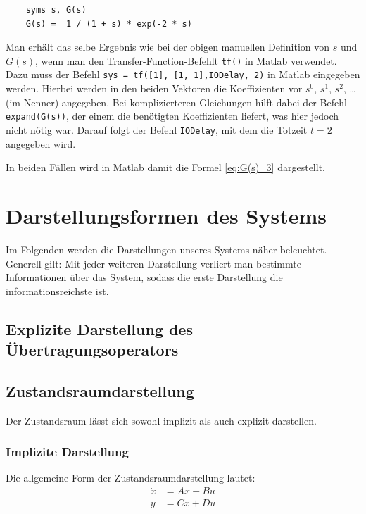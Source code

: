 \begin{verbatim}
    syms s, G(s)
    G(s) =  1 / (1 + s) * exp(-2 * s)
\end{verbatim}

Man erhält das selbe Ergebnis wie bei der obigen manuellen Definition von $s$ und $G(s)$, wenn man den Transfer-Function-Befehlt \texttt{tf()} in Matlab verwendet. \\
Dazu muss der Befehl \texttt{sys = tf([1], [1, 1],\textquotedbl IODelay\textquotedbl, 2)} in Matlab eingegeben werden. Hierbei werden in den beiden Vektoren die Koeffizienten vor $s^0$, $s^1$, $s^2$, \ldots (im Nenner) angegeben. Bei komplizierteren Gleichungen hilft dabei der Befehl \texttt{expand(G(s))}, der einem die benötigten Koeffizienten liefert, was hier jedoch nicht nötig war. Darauf folgt der Befehl \texttt{\textquotedbl IODelay\textquotedbl}, mit dem die Totzeit $t = 2$ angegeben wird.

In beiden Fällen wird in Matlab damit die Formel \ref{eq:G(s)_3} dargestellt.

\section{Darstellungsformen des Systems}
Im Folgenden werden die Darstellungen unseres Systems näher beleuchtet. Generell gilt: Mit jeder weiteren Darstellung verliert man bestimmte Informationen über das System, sodass die erste Darstellung die informationsreichste ist.

\subsection{Explizite Darstellung des Übertragungsoperators}

\subsection{Zustandsraumdarstellung}
Der Zustandsraum lässt sich sowohl implizit als auch explizit darstellen.

\subsubsection{Implizite Darstellung}

Die allgemeine Form der Zustandsraumdarstellung lautet:
\begin{align*}
    \dot x & = Ax + Bu \nonumber \\
    y & = Cx + Du
\end{align*}

